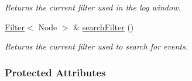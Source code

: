 \begin{DoxyCompactItemize}
\begin{DoxyCompactList}\small\item\em Returns the current filter used in the log window. \end{DoxyCompactList}\item 
\hyperlink{structslb_1_1core_1_1ui_1_1Filter}{Filter}$<$ Node $>$ \& \hyperlink{structslb_1_1core_1_1ui_1_1VisualizerData_a145ad9defb5cf8ce986a329198fe451b}{search\+Filter} ()
\begin{DoxyCompactList}\small\item\em Returns the current filter used to search for events. \end{DoxyCompactList}\end{DoxyCompactItemize}
\subsubsection*{Protected Attributes}
